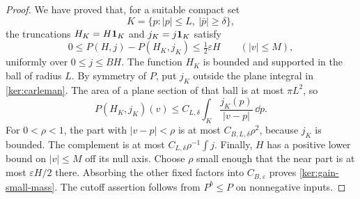 \begin{proof}
We have proved that, for a suitable compact set
\[
 K=\{p:|p|\leq L,\ |\bar p|\geq\delta\},
\]
the truncations $H_K=H\mathbf 1_K$ and $j_K=j\mathbf 1_K$ satisfy
\[
 0\leq P(H,j)-P(H_K,j_K)\leq\tfrac12\varepsilon H
       \qquad (|v|\leq M),
\]
uniformly over $0\leq j\leq BH$.
The function $H_K$ is bounded and supported in the ball of radius
$L$. By symmetry of $P$, put $j_K$ outside the plane integral in
\eqref{ker:carleman}. The area of a plane section of that ball is
at most $\pi L^2$, so
\[
 P(H_K,j_K)(v)\leq C_{L,\delta}
              \int_K\frac{j_K(p)}{|v-p|}\,\dd p.
\]
For $0<\rho<1$, the part with $|v-p|<\rho$ is at most
$C_{B,L,\delta}\rho^2$, because $j_K$ is bounded. The complement
is at most
$C_{L,\delta}\rho^{-1}\int j$.
Finally, $H$ has a positive lower bound on $|v|\leq M$ off its
null axis. Choose $\rho$ small enough that the near part is at most
$\varepsilon H/2$ there. Absorbing the other fixed factors into
$C_{B,\varepsilon}$ proves \eqref{ker:gain-small-mass}.
The cutoff assertion follows from $P^b\leq P$ on nonnegative inputs.
\end{proof}
